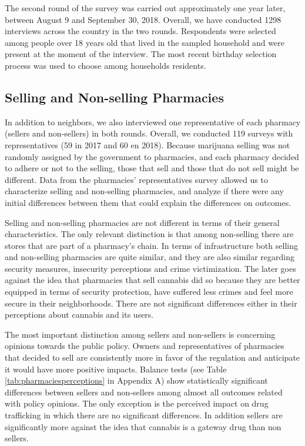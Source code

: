 \documentclass[11pt]{article}
\begin{document}
The second round of the survey was carried out approximately one year later, between August 9 and September 30, 2018. Overall, we have conducted 1298 interviews across the country in the two rounds. Respondents were selected among people over 18 years old that lived in the sampled household and were present at the moment of the interview. The most recent birthday selection process was used to choose among households residents.

\subsection{Selling and Non-selling Pharmacies}
In addition to neighbors, we also interviewed one representative of each pharmacy (sellers and non-sellers) in both rounds. Overall, we conducted 119 surveys with representatives (59 in 2017 and 60 en 2018). Because marijuana selling was not randomly assigned by the government to pharmacies, and each pharmacy decided to adhere or not to the selling, those that sell and those that do not sell might be different. Data from the pharmacies' representatives survey allowed us to characterize selling and non-selling pharmacies, and analyze if there were any initial differences between them that could explain the differences on outcomes.

Selling and non-selling pharmacies are not different in terms of their general characteristics. The only relevant distinction is that among non-selling there are stores that are part of a pharmacy's chain. In terms of infrastructure both selling and non-selling pharmacies are quite similar, and they are also similar regarding security measures, insecurity perceptions and crime victimization. The later goes against the idea that pharmacies that sell cannabis did so because they are better equipped in terms of security protection, have suffered less crimes and feel more secure in their neighborhoods. There are not significant differences either in their perceptions about cannabis and its users.

The most important distinction among sellers and non-sellers is concerning opinions towards the public policy. Owners and representatives of pharmacies that decided to sell are consistently more in favor of the regulation and anticipate it would have more positive impacts. Balance tests (see Table \ref{tab:pharmaciesperceptions} in Appendix A) show statistically significant differences between sellers and non-sellers among almost all outcomes related with policy opinions. The only exception is the perceived impact on drug trafficking in which there are no significant differences. In addition sellers are significantly more against the idea that cannabis is a gateway drug than non sellers.
\end{document}
